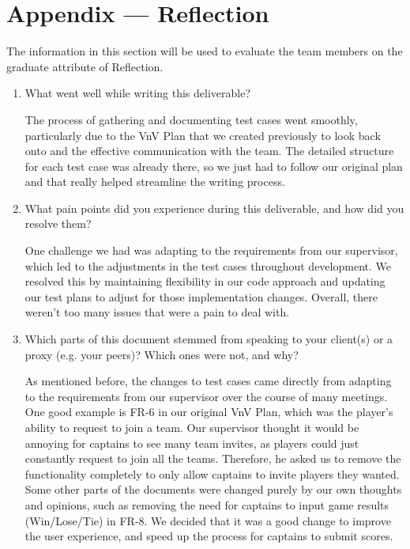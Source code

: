 \documentclass[12pt, titlepage]{article}
\begin{document}
\newpage{}
\section*{Appendix --- Reflection}

The information in this section will be used to evaluate the team members on the
graduate attribute of Reflection.



\begin{enumerate}
  \item What went well while writing this deliverable?
  
  The process of gathering and documenting test cases went smoothly, particularly due to the VnV Plan that we created previously to look back onto and the effective communication with the team. The detailed structure for each test case was already there, so we just had to follow our original plan and that really helped streamline the writing process.
  
  \item What pain points did you experience during this deliverable, and how
    did you resolve them?
    
    One challenge we had was adapting to the requirements from our supervisor, which led to the adjustments in the test cases throughout development. We resolved this by maintaining flexibility in our code approach and updating our test plans to adjust for those implementation changes. Overall, there weren't too many issues that were a pain to deal with.
     
  \item Which parts of this document stemmed from speaking to your client(s) or
  a proxy (e.g. your peers)? Which ones were not, and why?
  
  As mentioned before, the changes to test cases came directly from adapting to the requirements from our supervisor over the course of many meetings. One good example is FR-6 in our original VnV Plan, which was the player's ability to request to join a team. Our supervisor thought it would be annoying for captains to see many team invites, as players could just constantly request to join all the teams. Therefore, he asked us to remove the functionality completely to only allow captains to invite players they wanted. Some other parts of the documents were changed purely by our own thoughts and opinions, such as removing the need for captains to input game results (Win/Lose/Tie) in FR-8. We decided that it was a good change to improve the user experience, and speed up the process for captains to submit scores.
  

\end{enumerate}
\end{document}

